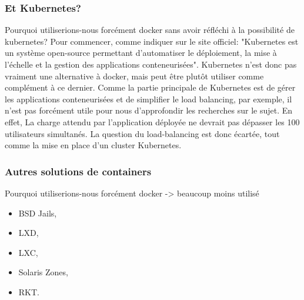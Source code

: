 \documentclass[
    iai, %
    il, %
]{heig-tb}
\begin{document}
\subsubsection{Et Kubernetes?}
Pourquoi utiliserions-nous forcément docker sans avoir réfléchi à la possibilité de \Gls{kubernetes}?
Pour commencer, comme indiquer sur le site officiel:
"Kubernetes est un système open-source permettant d'automatiser le déploiement, la mise à l'échelle et la gestion des applications conteneurisées".\newline
Kubernetes n'est donc pas vraiment une alternative à docker, mais peut être plutôt utiliser comme complément à ce dernier.\newline
Comme la partie principale de Kubernetes est de gérer les applications conteneurisées et de simplifier le load balancing, par exemple, il n'est pas forcément utile pour nous d'approfondir les recherches sur le sujet.\newline
En effet, La charge attendu par l'application déployée ne devrait pas dépasser les 100 utilisateurs simultanés. La question du load-balancing est donc écartée, tout comme la mise en place d'un cluster Kubernetes.




\subsubsection{Autres solutions de containers}
Pourquoi utiliserions-nous forcément \Gls{docker}
-> beaucoup moins utilisé

\begin{itemize}
    \item BSD Jails, %
    \item LXD, %
    \item LXC, %
    \item Solaris Zones, %
    \item RKT. %
\end{itemize}
\end{document}
